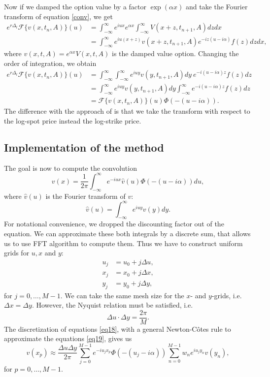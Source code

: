 Now if we damped the option value by a factor $\exp(\alpha x)$ and take the Fourier transform of equation \eqref{conv}, we get
\begin{align*}
e^{r\Delta_t}\mathcal{F}\{v(x,t_n,A)\}(u) &= \int_{-\infty}^\infty e^{iux} e^{\alpha x} \int_{-\infty}^\infty V(x+z,t_{n+1},A)dzdx \\
&= \int_{-\infty}^\infty e^{iu(x+z)}v(x+z,t_{n+1},A)e^{-iz(u-i\alpha)}f(z)dzdx,
\end{align*}
where $v(x,t,A) = e^{\alpha x}V(x,t,A)$ is the damped value option. Changing the order of integration, we obtain
\begin{align*}
e^{r\Delta_t}\mathcal{F}\{v(x,t_n,A)\}(u) &= \int_{-\infty}^\infty\int_{-\infty}^\infty e^{iuy}v(y,t_{n+1},A)dy~e^{-i(u-i\alpha) z}f(z)dz\\
&= \int_{-\infty}^\infty e^{iuy}v(y,t_{n+1},A)dy \int_{-\infty}^\infty e^{-i(u-i\alpha)z}f(z)dz \\
&= \mathcal{F}\{v(x,t_n,A)\}(u)\Phi(-(u-i\alpha)).
\end{align*}
The difference with the approach of \citeauthor{CM99} \citeyearpar{CM99} \cite{CM99} is that we take the transform with respect to the log-spot price instead the log-strike price.

\subsection{Implementation of the method}
The goal is now to compute the convolution 
\begin{equation}\label{eq18}
v(x) = \frac{1}{2\pi}\int_{-\infty}^\infty e^{-iux}\hat{v}(u)\Phi(-(u-i\alpha))du,
\end{equation}
where $\hat{v}(u)$ is the Fourier transform of $v$:
\begin{equation}\label{eq19}
\hat{v}(u) = \int_{-\infty}^\infty e^{iuy}v(y)dy.
\end{equation}
For notational convenience, we dropped the discounting factor out of the equation. We can approximate these both integrals by a discrete sum, that allows us to use FFT algorithm to compute them. Thus we have to construct uniform grids for $u,x$ and $y$:
\begin{align*}
u_j &= u_0 + j\Delta u,\\
x_j &= x_0 + j\Delta x,\\
y_j &= y_0 +j\Delta y,
\end{align*}
for $j = 0,\ldots,M-1$. We can take the same mesh size for the $x$- and $y$-grids, i.e. $\Delta x = \Delta y$. However, the Nyquist relation must be satisfied, i.e.
$$\Delta u \cdot \Delta y = \frac{2\pi}{M}.$$
The discretization of equations \eqref{eq18}, with a general Newton-C\^otes rule to approximate the equations \eqref{eq19}, gives us
$$v(x_p)\approx\frac{\Delta u \Delta y}{2\pi}\sum_{j=0}^{M-1}e^{-iu_jx_p}\Phi(-(u_j-i\alpha))\sum_{n=0}^{M-1}w_ne^{iu_jy_n}v(y_n),$$
for $p=0,\ldots,M-1$. 

